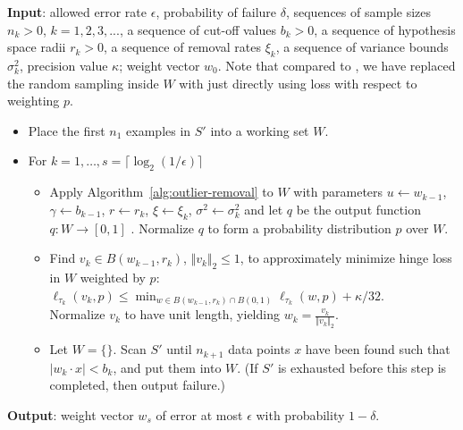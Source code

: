 \documentclass[11pt]{article}
\newcommand{\0}{\mathbf{0}}
\newcommand{\1}{\mathbf{1}}
\newcommand{\cA}{\mathcal{A}}
\begin{document}
\newcommand{\rounds}{s}
\addtocounter{algorithm}{1}
\begin{algorithm}[h]
\caption{\label{alg:active-algorithm-malicious}{\sc Efficient Learning of Linear Separators in the $\cA^{mal}_\eta$ model}
}
\textbf{Input}: allowed error rate $\epsilon$, probability of failure $\delta$,
sequences of sample sizes $n_k > 0$, $k = 1,2,3,...$,
a sequence of cut-off values $b_k >0$,
a sequence of hypothesis space radii $r_k >0$,
a sequence of removal rates $\xi_k$,
a sequence of variance bounds $\sigma^2_k$, precision value $\kappa$; weight vector $w_0$.
Note that compared to \cite{awasthi2017power}, we have replaced the random sampling inside $W$ with just directly using loss with respect to weighting $p$.
\begin{itemize}
\item[1.] Place the first $n_1$ examples in $S'$ into a working set $W$.
\item[2.] {For $k=1,\ldots, \rounds = \lceil \log_2(1/\epsilon) \rceil$}
\begin{itemize}
\item[a.] {Apply Algorithm~\ref{alg:outlier-removal} to $W$ with parameters
$u \leftarrow {w}_{k-1}$, $\gamma \leftarrow b_{k-1}$, $r \leftarrow r_k$, $\xi \leftarrow \xi_k$, $\sigma^2 \leftarrow \sigma^2_k$ and let $q$ be the output function $q: W \rightarrow [0,1]$ . Normalize $q$ to form a probability
   distribution $p$ over $W$.}
\item[b.] {Find ${v}_k \in B({w}_{k-1},r_k)$, $\Vert {v}_k \Vert_2 \leq 1$,
to approximately minimize hinge loss in $W$ weighted by $p$:
$\ell_{\tau_k}({v}_k ,p) \leq \min_{w \in B({w}_{k-1},r_k) \cap B(0,1)}
            \ell_{\tau_k}(w,p) + \kappa/32$.  \- \-\\
 Normalize ${v}_k$ to have unit length, yielding
${w}_k = \frac{{v}_k}{\Vert {v}_k \Vert_2}$.}
\item[c.] Let $W=\{\}$.  Scan $S'$ until
$n_{k+1}$ data points $x$ have been found such that $|{w}_{k}\cdot x| < b_k$, and put them into $W$.  (If $S'$ is exhausted before this step is completed, then output failure.)
\end{itemize}
\end{itemize}
{\textbf{Output}: weight vector $w_{\rounds}$ of error at
most $\epsilon$ with probability $1-\delta$.}
\end{algorithm}
\end{document}
